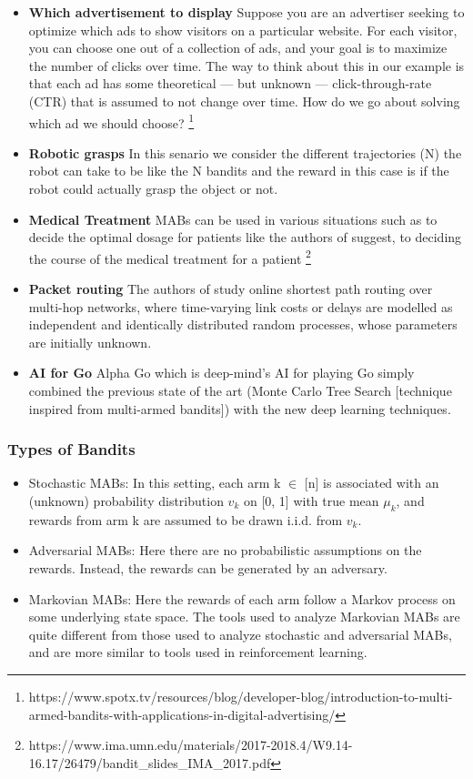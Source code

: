 \documentclass[11pt]{article}
\begin{document}
\begin{itemize}
    \item \textbf{Which advertisement to display} Suppose you are an advertiser seeking to optimize which ads to show visitors on a particular website. For each visitor, you can choose one out of a collection of ads, and your goal is to maximize the number of clicks over time. The way to think about this in our example is that each ad has some theoretical — but unknown — click-through-rate (CTR) that is assumed to not change over time. How do we go about solving which ad we should choose? \footnote{https://www.spotx.tv/resources/blog/developer-blog/introduction-to-multi-armed-bandits-with-applications-in-digital-advertising/}
    \item \textbf{Robotic grasps} In this senario we consider the  different trajectories (N) the robot can take to be like the N bandits and the reward in this case is if the robot could actually grasp the object or not. 
    \item \textbf{Medical Treatment} MABs can be used in various situations such as to decide the optimal dosage for patients like the authors of \cite{aziz2021multi} suggest, to deciding the course of the medical treatment for a patient \footnote{https://www.ima.umn.edu/materials/2017-2018.4/W9.14-16.17/26479/bandit\_slides\_IMA\_2017.pdf}
    \item \textbf{Packet routing} The authors of \cite{talebi2017stochastic} study online shortest path routing over multi-hop networks, where time-varying link costs or delays are modelled as independent and identically distributed random processes, whose parameters are initially unknown.
    \item \textbf{AI for Go} Alpha Go which is deep-mind's AI for playing Go  simply combined the previous state of the art (Monte Carlo Tree Search [technique inspired from multi-armed bandits]) with the new deep learning techniques.
\end{itemize}
\subsubsection{Types of Bandits}
\begin{itemize}
    \item Stochastic MABs: In this setting, each arm k $\in$ [n] is associated with an (unknown) probability distribution $v_k$ on [0, 1] with true mean $\mu_{k}$, and rewards from arm k are assumed to be drawn i.i.d. from $v_k$.
\item Adversarial MABs: Here there are no probabilistic assumptions on the rewards. Instead, the rewards can be generated by an adversary.
\item Markovian MABs: Here the rewards of each arm follow a Markov process on some underlying state space. The tools used to analyze Markovian MABs are quite different from those used to analyze stochastic and adversarial MABs, and are more similar to tools used in reinforcement learning.
\end{itemize}  
\end{document}

